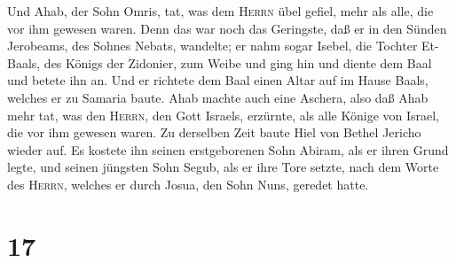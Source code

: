  Und Ahab, der Sohn Omris, tat, was dem \textsc{Herrn}
übel gefiel, mehr als alle, die vor ihm gewesen waren. 
Denn das war noch das Geringste, daß er in den Sünden Jerobeams, des
Sohnes Nebats, wandelte; er nahm sogar Isebel, die Tochter Et-Baals, des
Königs der Zidonier, zum Weibe und ging hin und diente dem Baal und
betete ihn an.  Und er richtete dem Baal einen Altar auf
im Hause Baals, welches er zu Samaria baute.  Ahab machte
auch eine Aschera, also daß Ahab mehr tat, was den \textsc{Herrn}, den
Gott Israels, erzürnte, als alle Könige von Israel, die vor ihm gewesen
waren.  Zu derselben Zeit baute Hiel von Bethel Jericho
wieder auf. Es kostete ihn seinen erstgeborenen Sohn Abiram, als er
ihren Grund legte, und seinen jüngsten Sohn Segub, als er ihre Tore
setzte, nach dem Worte des \textsc{Herrn}, welches er durch Josua, den
Sohn Nuns, geredet hatte.

\hypertarget{section-16}{%
\section{17}\label{section-16}}

